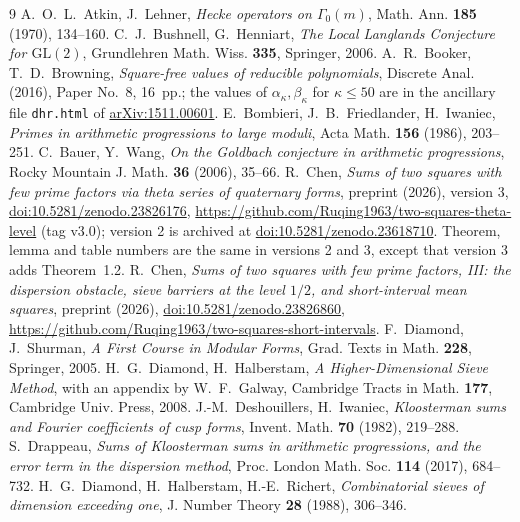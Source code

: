 ﻿\documentclass[11pt]{amsart}
\theoremstyle{remark}
\begin{document}
\begin{thebibliography}{9}
 A.~O.~L.~Atkin, J.~Lehner, \emph{Hecke operators on $\Gamma_0(m)$}, Math. Ann. \textbf{185} (1970), 134--160.
 C.~J.~Bushnell, G.~Henniart, \emph{The Local Langlands Conjecture for $\mathrm{GL}(2)$}, Grundlehren Math. Wiss. \textbf{335}, Springer, 2006.
 A.~R.~Booker, T.~D.~Browning, \emph{Square-free values of reducible polynomials}, Discrete Anal. (2016), Paper No.~8, 16~pp.; the values of $\alpha_\kappa,\beta_\kappa$ for $\kappa\le50$ are in the ancillary file \texttt{dhr.html} of \href{https://arxiv.org/abs/1511.00601}{arXiv:1511.00601}.
 E.~Bombieri, J.~B.~Friedlander, H.~Iwaniec, \emph{Primes in arithmetic progressions to large moduli}, Acta Math. \textbf{156} (1986), 203--251.
 C.~Bauer, Y.~Wang, \emph{On the Goldbach conjecture in arithmetic progressions}, Rocky Mountain J. Math. \textbf{36} (2006), 35--66.
 R.~Chen, \emph{Sums of two squares with few prime factors via theta series of quaternary forms}, preprint (2026), version 3, \href{https://doi.org/10.5281/zenodo.23826176}{doi:10.5281/zenodo.23826176}, \url{https://github.com/Ruqing1963/two-squares-theta-level} (tag v3.0); version 2 is archived at \href{https://doi.org/10.5281/zenodo.23618710}{doi:10.5281/zenodo.23618710}. Theorem, lemma and table numbers are the same in versions 2 and 3, except that version 3 adds Theorem~1.2.
 R.~Chen, \emph{Sums of two squares with few prime factors, III: the dispersion obstacle, sieve barriers at the level $1/2$, and short-interval mean squares}, preprint (2026), \href{https://doi.org/10.5281/zenodo.23826860}{doi:10.5281/zenodo.23826860}, \url{https://github.com/Ruqing1963/two-squares-short-intervals}.
 F.~Diamond, J.~Shurman, \emph{A First Course in Modular Forms}, Grad. Texts in Math. \textbf{228}, Springer, 2005.
 H.~G.~Diamond, H.~Halberstam, \emph{A Higher-Dimensional Sieve Method}, with an appendix by W.~F.~Galway, Cambridge Tracts in Math. \textbf{177}, Cambridge Univ. Press, 2008.
 J.-M.~Deshouillers, H.~Iwaniec, \emph{Kloosterman sums and Fourier coefficients of cusp forms}, Invent. Math. \textbf{70} (1982), 219--288.
 S.~Drappeau, \emph{Sums of Kloosterman sums in arithmetic progressions, and the error term in the dispersion method}, Proc. London Math. Soc. \textbf{114} (2017), 684--732.
 H.~G.~Diamond, H.~Halberstam, H.-E.~Richert, \emph{Combinatorial sieves of dimension exceeding one}, J. Number Theory \textbf{28} (1988), 306--346.

\end{thebibliography}
\end{document}
